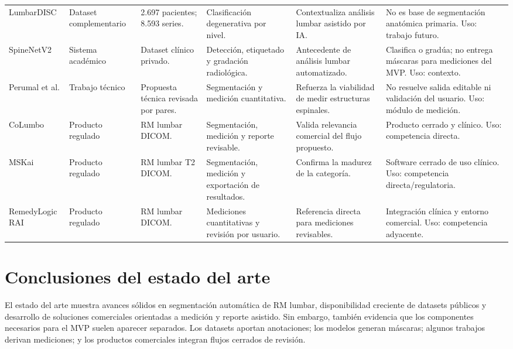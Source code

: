 \begin{table}[H]
\begin{adjustbox}{width=\textwidth}
\begin{tabularx}{\textwidth}{p{} p{} p{} X X X}
LumbarDISC \parencite{richards_lumbardisc_2026} & Dataset complementario & 2.697 pacientes; 8.593 series. & Clasificación degenerativa por nivel. & Contextualiza análisis lumbar asistido por IA. & No es base de segmentación anatómica primaria. Uso: trabajo futuro. \\
SpineNetV2 \parencite{jamaludin_spinenet_2017,windsor_spinenet_2024} & Sistema académico & Dataset clínico privado. & Detección, etiquetado y gradación radiológica. & Antecedente de análisis lumbar automatizado. & Clasifica o gradúa; no entrega máscaras para mediciones del MVP. Uso: contexto. \\
Perumal et al. \parencite{perumal_thecal_sac_2026} & Trabajo técnico & Propuesta técnica revisada por pares. & Segmentación y medición cuantitativa. & Refuerza la viabilidad de medir estructuras espinales. & No resuelve salida editable ni validación del usuario. Uso: módulo de medición. \\
CoLumbo \parencite{fda_columbo_2022} & Producto regulado & RM lumbar DICOM. & Segmentación, medición y reporte revisable. & Valida relevancia comercial del flujo propuesto. & Producto cerrado y clínico. Uso: competencia directa. \\
MSKai \parencite{fda_mskai_2024} & Producto regulado & RM lumbar T2 DICOM. & Segmentación, medición y exportación de resultados. & Confirma la madurez de la categoría. & Software cerrado de uso clínico. Uso: competencia directa/regulatoria. \\
RemedyLogic RAI \parencite{fda_remedylogic_2024} & Producto regulado & RM lumbar DICOM. & Mediciones cuantitativas y revisión por usuario. & Referencia directa para mediciones revisables. & Integración clínica y entorno comercial. Uso: competencia adyacente. \\
\hline
\end{tabularx}
\end{adjustbox}
\end{table}

\section{Conclusiones del estado del arte}

El estado del arte muestra avances sólidos en segmentación automática de RM lumbar, disponibilidad creciente de datasets públicos y desarrollo de soluciones comerciales orientadas a medición y reporte asistido. Sin embargo, también evidencia que los componentes necesarios para el MVP suelen aparecer separados. Los datasets aportan anotaciones; los modelos generan máscaras; algunos trabajos derivan mediciones; y los productos comerciales integran flujos cerrados de revisión.

